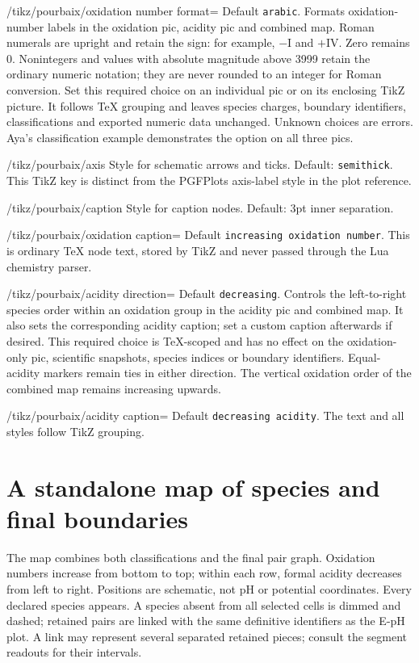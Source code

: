\documentclass[a4paper,11pt]{ltxdoc}
\begin{document}
\begin{key}{/tikz/pourbaix/oxidation number format=}
Default \texttt{arabic}. Formats oxidation-number labels in the oxidation pic,
acidity pic and combined map. Roman numerals are upright and retain the sign:
for example, $-\mathrm{I}$ and $+\mathrm{IV}$. Zero remains $0$.
Nonintegers and values with absolute magnitude above 3999 retain the ordinary
numeric notation; they are never rounded to an integer for Roman conversion.
Set this required choice on an individual pic or on its enclosing TikZ picture.
It follows TeX grouping and leaves species charges, boundary identifiers,
classifications and exported numeric data unchanged. Unknown choices are errors.
Aya's classification example demonstrates the option on all three pics.
\end{key}
\begin{key}{/tikz/pourbaix/axis}
Style for schematic arrows and ticks. Default: \texttt{semithick}. This TikZ key
is distinct from the PGFPlots axis-label style in the plot reference.
\end{key}
\begin{key}{/tikz/pourbaix/caption}
Style for caption nodes. Default: 3pt inner separation.
\end{key}
\begin{key}{/tikz/pourbaix/oxidation caption=}
Default \texttt{increasing oxidation number}. This is ordinary TeX node text,
stored by TikZ and never passed through the Lua chemistry parser.
\end{key}
\begin{key}{/tikz/pourbaix/acidity direction=}
Default \texttt{decreasing}. Controls the left-to-right species order within
an oxidation group in the acidity pic and combined map. It also sets the
corresponding acidity caption; set a custom caption afterwards if desired.
This required choice is TeX-scoped and has no effect on the oxidation-only pic,
scientific snapshots, species indices or boundary identifiers. Equal-acidity
markers remain ties in either direction. The vertical oxidation order of the
combined map remains increasing upwards.
\end{key}
\begin{key}{/tikz/pourbaix/acidity caption=}
Default \texttt{decreasing acidity}. The text and all styles follow TikZ grouping.
\end{key}

\section{A standalone map of species and final boundaries}
The map combines both classifications and the final pair graph. Oxidation numbers
increase from bottom to top; within each row, formal acidity decreases from left
to right. Positions are schematic, not pH or potential coordinates. Every declared
species appears. A species absent from all selected cells is dimmed and dashed;
retained pairs are linked with the same definitive identifiers as the E-pH plot.
A link may represent several separated retained pieces; consult the segment
readouts for their intervals.
\end{document}
